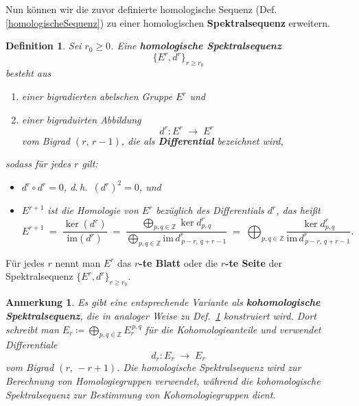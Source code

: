 \documentclass[12pt]{article}
\numberwithin{conj}{section}
\newtheorem{definition}[conj]{Definition}
\newtheorem{remark}[conj]{Anmerkung}
\newcommand{\Z}{\mathbb{Z}}
\begin{document}
    Nun können wir die zuvor definierte homologische Sequenz (Def. \ref{homologischeSequenz})
    zu einer homologischen \textbf{Spektralsequenz} erweitern.

    \begin{definition}
        \label{homologischeSpektraleSequenz} Sei $r_{0} \geq 0$. Eine \textbf{homologische
        Spektralsequenz}
        \[
            \{E^{r},d^{r}\}_{r \geq r_0}
        \]
        besteht aus
        \begin{enumerate}[nolistsep]
            \item einer bigradierten abelschen Gruppe $E^{r}$ und

            \item einer bigraduirten Abbildung
                \[
                    d^{r} : E^{r} \;\longrightarrow\; E^{r}
                \]
                vom Bigrad $(r,\,r-1)$, die als \textbf{Differential} bezeichnet wird,
        \end{enumerate}
        sodass für jedes $r$ gilt:
        \begin{itemize}[nolistsep]
            \item $d^{r} \circ d^{r} = 0$, d.\,h.\ $(d^{r})^{2} = 0$, und

            \item $E^{r+1}$ ist die Homologie von $E^{r}$ bezüglich des Differentials $d
                ^{r}$, das heißt
                \[
                    E^{r+1}\;=\; \frac{\ker(d^{r})}{\mathrm{im}(d^{r})}\;=\; \frac{\displaystyle\bigoplus_{p,q
                    \in \Z}\ker d^{r}_{p,q} }%
                    {\displaystyle\bigoplus_{p,q \in \Z} \mathrm{im}\, d^r_{\,p-r,\,q+r-1} }
                    \;=\; \bigoplus_{p,q \in \Z}\frac{\ker d^{r}_{p,q} }{\mathrm{im}\, d^{r}_{\,p-r,\,q+r-1} }
                    .
                \]
        \end{itemize}
    \end{definition}

    Für jedes $r$ nennt man $E^{r}$ das \textbf{$r$-te Blatt} oder die \textbf{$r$-te
    Seite} der Spektralsequenz $\{E^{r},d^{r}\}_{r \geq r_0}$.

    \begin{remark}
        Es gibt eine entsprechende Variante als \textbf{kohomologische
        Spektralsequenz}, die in analoger Weise zu Def.~\ref{homologischeSpektraleSequenz}
        konstruiert wird. Dort schreibt man
        $E_{r} \coloneqq \bigoplus_{p,q \in \Z}E_{r}^{\,p,q}$ für die
        Kohomologieanteile und verwendet Differentiale
        \[
            d_{r} : E_{r} \;\longrightarrow\; E_{r}
        \]
        vom Bigrad $(r,\,-r+1)$. Die homologische Spektralsequenz wird zur Berechnung
        von Homologiegruppen verwendet, während die kohomologische Spektralsequenz
        zur Bestimmung von Kohomologiegruppen dient.
    \end{remark}
\end{document}
